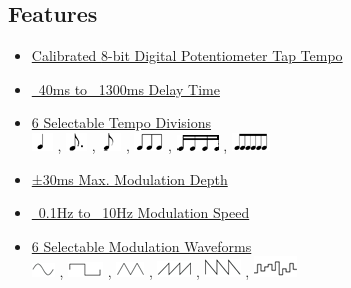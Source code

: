 \documentclass[a4paper, 10pt]{article}
\begin{document}
\begin{multicols}{2}
\section{Features}
\bigbreak
\begin{itemize}
\item \hyperref[sec:calib]{Calibrated }\hyperref[sec:digpot]{8-bit Digital Potentiometer Tap Tempo}
\item \hyperref[subsec:delaytime]{~40ms to ~1300ms Delay Time}
\item \hyperref[subsec:tempodiv]{6 Selectable Tempo Divisions} \\ \includegraphics[scale=1]{fourth} , \includegraphics[scale=1]{dotted-eight} , \includegraphics[scale=1]{eight} , \includegraphics[scale=1]{triplet} , \includegraphics[scale=1]{sixteenth} , \includegraphics[scale=1]{sextuplet}
\item \hyperref[subsec:moddepthspeed]{±30ms Max. Modulation Depth}
\item \hyperref[subsec:moddepthspeed]{~0.1Hz to ~10Hz Modulation Speed}
\item \hyperref[subsec:waveformsel]{6 Selectable Modulation Waveforms}\\ \includegraphics[scale=1]{sine} , \includegraphics[scale=1]{square} , \includegraphics[scale=1]{triangle} , \includegraphics[scale=1]{rampup} , \includegraphics[scale=1]{rampdown} , \includegraphics[scale=1]{random}

\end{itemize}
\end{multicols}
\end{document}
